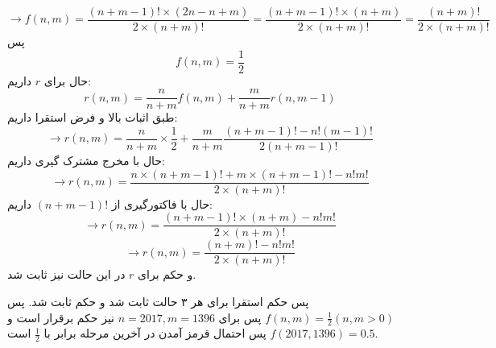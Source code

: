 \documentclass[12pt,a4paper]{article}
\begin{document}
\begin{enumerate}
$$
\rightarrow f(n, m) = \frac{
	(n+m-1)! \times (2n - n + m)
}{
	2 \times (n+m)!
} = \frac{
(n+m-1)! \times (n + m)
}{
2 \times (n+m)!
} = \frac{
(n+m)!
}{
2 \times (n+m)!
}
$$
پس
$$f(n, m) = \frac{1}{2}$$
حال برای $r$ داریم:
$$r(n, m) = \frac{n}{n+m} f(n, m) + \frac{m}{n+m} r(n, m-1)$$
طبق اثبات بالا و فرض استقرا داریم:
$$
\rightarrow r(n, m) = \frac{n}{n+m} \times \frac{1}{2} +
 \frac{m}{n+m} \frac{(n+m-1)!-n!(m-1)!}{2(n+m-1)!}$$
 حال با مخرج مشترک گیری داریم:
$$
\rightarrow r(n, m) = \frac{
 	n \times (n+m-1)! + m\times (n+m-1)! - n!m!
}{
	2 \times (n+m)!
}
$$
حال با فاکتورگیری از $(n+m-1)!$ داریم:
$$
\rightarrow r(n, m) = \frac{
	(n+m-1)!\times(n+m) - n!m!
}{
	2 \times (n+m)!
}
$$
$$
\rightarrow r(n, m) = \frac{
	(n+m)! - n!m!
}{
	2 \times (n+m)!
}
$$
و حکم برای $r$ در این حالت نیز ثابت شد.
\end{enumerate}
پس حکم استقرا برای هر ۳ حالت ثابت شد و حکم ثابت شد.
پس $f(n, m) = \frac{1}{2} (n, m > 0)$ پس برای $n = 2017 , m = 1396$ نیز حکم برقرار است و $f(2017, 1396) = 0.5$ پس احتمال قرمز آمدن  در آخرین مرحله برابر با $\frac{1}{2}$ است.
\end{document}
